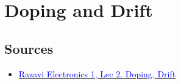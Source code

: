 \section{Doping and Drift}

\subsection{Sources}
\begin{itemize}
    \item \href{https://www.youtube.com/watch?v=NWolpDgi6_Y}{\textcolor{blue}{Razavi Electronics 1, Lec 2. Doping, Drift}}
\end{itemize}